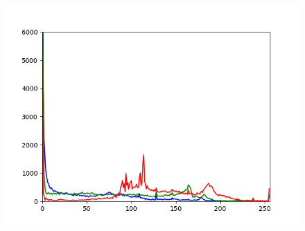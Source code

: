 \documentclass[a4paper,12pt,oneside]{article}
\begin{document}
\begin{figure}[htb]
\begin{minipage}[c]{0.08\textwidth}
\end{minipage}
\hfill
\begin{minipage}[c]{0.3\textwidth}
\includegraphics[width=\textwidth]{Sources/Bild1_HA_histo.png}
\end{minipage}
\end{figure}
\end{document}
